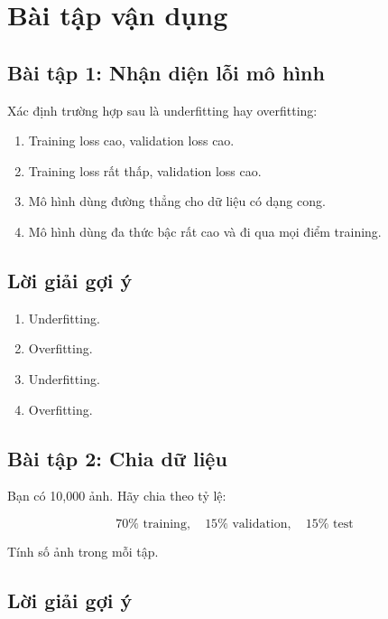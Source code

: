 \documentclass[12pt,a4paper]{report}
\begin{document}
\chapter{Bài tập vận dụng}

\section*{Bài tập 1: Nhận diện lỗi mô hình}

Xác định trường hợp sau là underfitting hay overfitting:

\begin{enumerate}
    \item Training loss cao, validation loss cao.
    \item Training loss rất thấp, validation loss cao.
    \item Mô hình dùng đường thẳng cho dữ liệu có dạng cong.
    \item Mô hình dùng đa thức bậc rất cao và đi qua mọi điểm training.
\end{enumerate}

\section*{Lời giải gợi ý}

\begin{enumerate}
    \item Underfitting.
    \item Overfitting.
    \item Underfitting.
    \item Overfitting.
\end{enumerate}

\section*{Bài tập 2: Chia dữ liệu}

Bạn có 10,000 ảnh. Hãy chia theo tỷ lệ:

\[
    70\% \text{ training}, \quad 15\% \text{ validation}, \quad 15\% \text{ test}
\]

Tính số ảnh trong mỗi tập.

\section*{Lời giải gợi ý}
\end{document}
